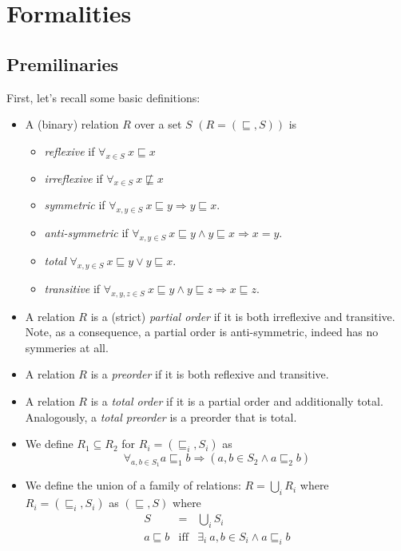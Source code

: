 \documentclass[12pt]{article}
\def\implies{\Rightarrow}
\theoremstyle{definition}
\theoremstyle{theorem}
\begin{document}
\section{Formalities}

\subsection{Premilinaries}

First, let's recall some basic definitions:
\begin{itemize}
\item A (binary) relation $R$ over a set $S$ \(\left(R=(\sqsubseteq,S)\right)\) is
  \begin{itemize}
  \item \emph{reflexive} if \(\forall_{x\in S}\:  x \sqsubseteq x\)
  \item \emph{irreflexive} if \(\forall_{x\in S}\:  x \not\sqsubseteq x\)
  \item \emph{symmetric} if \(\forall_{x,y \in S}\: x \sqsubseteq y \implies y \sqsubseteq x \).
  \item \emph{anti-symmetric} if \(\forall_{x,y \in S}\: x \sqsubseteq y \wedge y \sqsubseteq x \implies x = y\).
    \item \emph{total} \(\forall_{x,y \in S}\: x \sqsubseteq y \vee y \sqsubseteq x\).
  \item \emph{transitive} if \( \forall_{x,y,z \in S}\: x \sqsubseteq y \wedge y \sqsubseteq z \implies x \sqsubseteq z\).
  \end{itemize}
\item A relation $R$ is a (strict) \emph{partial order} if it is both irreflexive and transitive.
  Note, as a consequence, a partial order is anti-symmetric, indeed has no symmeries at all.
  \item A relation $R$ is a \emph{preorder} if it is both reflexive and transitive.
  \item A relation $R$ is a \emph{total order} if it is a partial order and additionally total.  Analogously, a \emph{total preorder} is a preorder that is total.
  \item We define $R_1 \subseteq R_2$ for \( R_i = (\sqsubseteq_i,S_i)\) as
    \[
    \forall_{a,b \in S_1} a \sqsubseteq_1 b \implies \left( a,b \in S_2 \wedge
    a \sqsubseteq_2 b \right)
    \]
  \item We define the union of a family of relations: \( R = \bigcup_i R_i
    \) where \( R_i = (\sqsubseteq_i, S_i) \) as \( (\sqsubseteq,S) \)
    where
    \begin{eqnarray*}
      S &=& \bigcup_i S_i \\
      a \sqsubseteq b &\textrm{iff}& \exists_i\: a,b \in S_i \wedge a
      \sqsubseteq_i b
    \end{eqnarray*}
\end{itemize}
\end{document}
